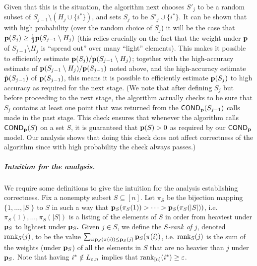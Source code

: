 Given that this is the situation, the algorithm next chooses
$S'_j$ to be a random subset of
$S_{j-1} \setminus (H_{j} \cup \{i^\ast\})$, and sets
$S_j$ to be $S'_j \cup \{i^\ast\}.$
It can be shown that
with high probability (over the random choice of $S_j$) it will be the case
that $\mathbf{p}(S_j) \geq {\frac{1}3} \mathbf{p}(S_{j-1} \setminus H_{j})$
(this relies crucially on the fact that
the weight under $\mathbf{p}$ of
$S_{j-1} \setminus H_{j}$ is ``spread out'' over many ``light'' elements).
This makes
it possible to efficiently estimate $\mathbf{p}(S_j)/\mathbf{p}(S_{j-1}
\setminus H_{j})$; together with the high-accuracy estimate of
$\mathbf{p}(S_{j-1} \setminus H_{j})/\mathbf{p}(S_{j-1})$ noted above, and
the high-accuracy estimate $\hat{\mathbf{p}}(S_{j-1})$ of $\mathbf{p}(S_{j-1})$,
this means it is
possible to efficiently estimate $\mathbf{p}(S_j)$ to high accuracy
as required for the next stage.
(We note that after defining $S_j$ but before proceeding to the next stage,
the algorithm actually checks to be sure that  $S_j$ contains at least one
point that was returned from the ${\sf COND}_{\mathbf{p}}(S_{j-1})$ calls made in the
past stage.  This check ensures that whenever the algorithm calls
${\sf COND}_{\mathbf{p}}(S)$ on a set $S$, it is guaranteed that $\mathbf{p}(S)>0$
as required by our ${\sf COND}_{\mathbf{p}}$ model.  Our analysis shows that doing this
check does not affect correctness of the algorithm since with high
probability the check always passes.)

\medskip

\subparagraph{Intuition for the analysis.}
We require some definitions to give the intuition for the analysis
establishing correctness.  Fix a nonempty subset $S \subseteq [n]$.
Let $\pi_S$ be the bijection mapping $\{1,\dots,|S|\}$ to
$S$ in such a way that
$\mathbf{p}_S(\pi_S(1)) > \cdots > \mathbf{p}_S(\pi_S(|S|))$, i.e.
$\pi_S(1),\dots,\pi_S(|S|)$ is a listing of the elements of $S$
in order from heaviest under $\mathbf{p}_S$ to lightest under $\mathbf{p}_S.$
Given $j \in S$, we define the \emph{$S$-rank of $j$}, denoted
$\operatorname{rank}_S(j)$, to be
the value $\sum_{i: \mathbf{p}_S(\pi(i)) \leq \mathbf{p}_S(j)} \mathbf{p}_S(\pi(i))$,
i.e. $\operatorname{rank}_S(j)$ is the sum of the weights (under $\mathbf{p}_S$) of
all the elements in $S$ that are no heavier than $j$ under $\mathbf{p}_S.$
Note that having $i^\ast \notin L_{\varepsilon,n}$ implies that
$\operatorname{rank}_{[n]}(i^\ast) \geq \varepsilon$.

